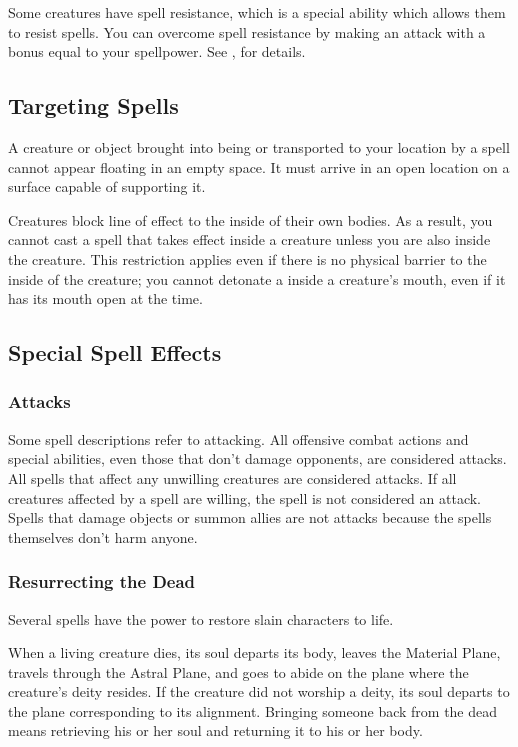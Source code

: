  Some creatures have spell resistance, which is a special ability which allows them to resist spells. You can overcome spell resistance by making an attack with a bonus equal to your spellpower. See , for details.

\subsection{Targeting Spells}

 A creature or object brought into being or transported to your location by a spell cannot appear floating in an empty space. It must arrive in an open location on a surface capable of supporting it.

 Creatures block line of effect to the inside of their own bodies. As a result, you cannot cast a spell that takes effect inside a creature unless you are also inside the creature. This restriction applies even if there is no physical barrier to the inside of the creature; you cannot detonate a  inside a creature's mouth, even if it has its mouth open at the time.

\subsection{Special Spell Effects}

\subsubsection{Attacks}
Some spell descriptions refer to attacking. All offensive combat actions and special abilities, even those that don't damage opponents, are considered attacks. All spells that affect any unwilling creatures are considered attacks. If all creatures affected by a spell are willing, the spell is not considered an attack. Spells that damage objects or summon allies are not attacks because the spells themselves don't harm anyone.

\subsubsection{Resurrecting the Dead}\label{Resurrecting the Dead}

Several spells have the power to restore slain characters to life.

When a living creature dies, its soul departs its body, leaves the Material Plane, travels through the Astral Plane, and goes to abide on the plane where the creature's deity resides. If the creature did not worship a deity, its soul departs to the plane corresponding to its alignment. Bringing someone back from the dead means retrieving his or her soul and returning it to his or her body.

